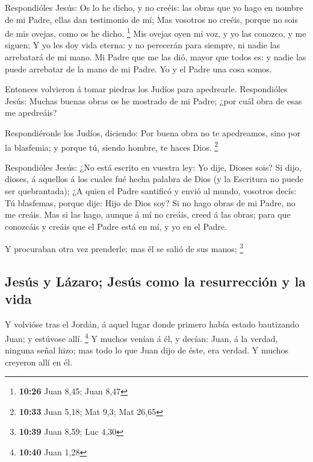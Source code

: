  Respondióles Jesús: Os lo he dicho, y no creéis: las obras
que yo hago en nombre de mi Padre, ellas dan testimonio de mí;
 Mas vosotros no creéis, porque no sois de mis ovejas, como
os he dicho. \footnote{\textbf{10:26} Juan 8,45; Juan 8,47}
 Mis ovejas oyen mi voz, y yo las conozco, y me siguen;
 Y yo les doy vida eterna: y no perecerán para siempre, ni
nadie las arrebatará de mi mano.  Mi Padre que me las dió,
mayor que todos es: y nadie las puede arrebatar de la mano de mi Padre.
 Yo y el Padre una cosa somos.

 Entonces volvieron á tomar piedras los Judíos para
apedrearle.  Respondióles Jesús: Muchas buenas obras os he
mostrado de mi Padre; ¿por cuál obra de esas me apedreáis?

 Respondiéronle los Judíos, diciendo: Por buena obra no te
apedreamos, sino por la blasfemia; y porque tú, siendo hombre, te haces
Dios. \footnote{\textbf{10:33} Juan 5,18; Mat 9,3; Mat 26,65}

 Respondióles Jesús: ¿No está escrito en vuestra ley: Yo
dije, Dioses sois?  Si dijo, dioses, á aquellos á los
cuales fué hecha palabra de Dios (y la Escritura no puede ser
quebrantada);  ¿A quien el Padre santificó y envió al
mundo, vosotros decís: Tú blasfemas, porque dije: Hijo de Dios soy?
 Si no hago obras de mi Padre, no me creáis. 
Mas si las hago, aunque á mí no creáis, creed á las obras; para que
conozcáis y creáis que el Padre está en mí, y yo en el Padre.

 Y procuraban otra vez prenderle; mas él se salió de sus
manos; \footnote{\textbf{10:39} Juan 8,59; Luc 4,30}

\hypertarget{jesuxfas-y-luxe1zaro-jesuxfas-como-la-resurrecciuxf3n-y-la-vida}{%
\subsection{Jesús y Lázaro; Jesús como la resurrección y la
vida}\label{jesuxfas-y-luxe1zaro-jesuxfas-como-la-resurrecciuxf3n-y-la-vida}}

 Y volvióse tras el Jordán, á aquel lugar donde primero
había estado bautizando Juan; y estúvose allí. \footnote{\textbf{10:40}
  Juan 1,28}  Y muchos venían á él, y decían: Juan, á la
verdad, ninguna señal hizo; mas todo lo que Juan dijo de éste, era
verdad.  Y muchos creyeron allí en él.


